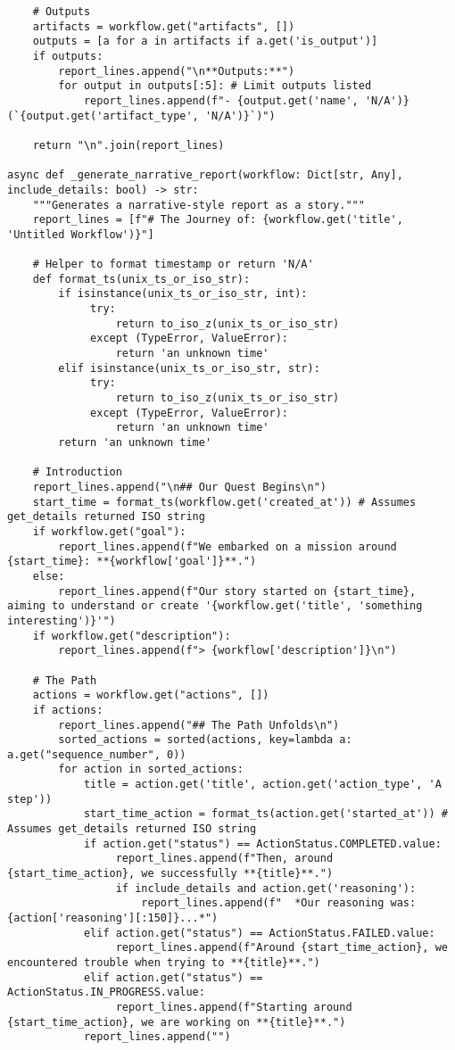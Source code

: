 \documentclass[12pt,a4paper]{article}
\begin{document}
\begin{pageablecode}
\begin{verbatim}
    # Outputs
    artifacts = workflow.get("artifacts", [])
    outputs = [a for a in artifacts if a.get('is_output')]
    if outputs:
        report_lines.append("\n**Outputs:**")
        for output in outputs[:5]: # Limit outputs listed
            report_lines.append(f"- {output.get('name', 'N/A')} (`{output.get('artifact_type', 'N/A')}`)")

    return "\n".join(report_lines)

async def _generate_narrative_report(workflow: Dict[str, Any], include_details: bool) -> str:
    """Generates a narrative-style report as a story."""
    report_lines = [f"# The Journey of: {workflow.get('title', 'Untitled Workflow')}"]

    # Helper to format timestamp or return 'N/A'
    def format_ts(unix_ts_or_iso_str):
        if isinstance(unix_ts_or_iso_str, int):
             try: 
                 return to_iso_z(unix_ts_or_iso_str)
             except (TypeError, ValueError): 
                 return 'an unknown time'
        elif isinstance(unix_ts_or_iso_str, str):
             try: 
                 return to_iso_z(unix_ts_or_iso_str)
             except (TypeError, ValueError): 
                 return 'an unknown time'
        return 'an unknown time'

    # Introduction
    report_lines.append("\n## Our Quest Begins\n")
    start_time = format_ts(workflow.get('created_at')) # Assumes get_details returned ISO string
    if workflow.get("goal"):
        report_lines.append(f"We embarked on a mission around {start_time}: **{workflow['goal']}**.")
    else:
        report_lines.append(f"Our story started on {start_time}, aiming to understand or create '{workflow.get('title', 'something interesting')}'")
    if workflow.get("description"): 
        report_lines.append(f"> {workflow['description']}\n")

    # The Path
    actions = workflow.get("actions", [])
    if actions:
        report_lines.append("## The Path Unfolds\n")
        sorted_actions = sorted(actions, key=lambda a: a.get("sequence_number", 0))
        for action in sorted_actions:
            title = action.get('title', action.get('action_type', 'A step'))
            start_time_action = format_ts(action.get('started_at')) # Assumes get_details returned ISO string
            if action.get("status") == ActionStatus.COMPLETED.value:
                 report_lines.append(f"Then, around {start_time_action}, we successfully **{title}**.")
                 if include_details and action.get('reasoning'): 
                     report_lines.append(f"  *Our reasoning was: {action['reasoning'][:150]}...*")
            elif action.get("status") == ActionStatus.FAILED.value:
                 report_lines.append(f"Around {start_time_action}, we encountered trouble when trying to **{title}**.")
            elif action.get("status") == ActionStatus.IN_PROGRESS.value:
                 report_lines.append(f"Starting around {start_time_action}, we are working on **{title}**.")
            report_lines.append("")


\end{verbatim}
\end{pageablecode}
\end{document}
